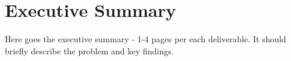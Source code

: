 \section*{Executive Summary}
\thispagestyle{empty}
\addtolength{\parskip}{\baselineskip}

Here goes the executive summary - 1-4 pages per each deliverable.
It should briefly describe the problem and key findings.
